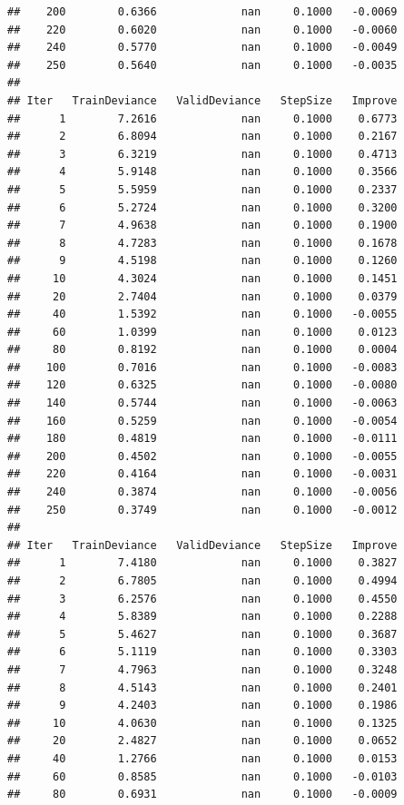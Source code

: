 \documentclass[]{book}
\begin{document}
\begin{verbatim}
##    200        0.6366             nan     0.1000   -0.0069
##    220        0.6020             nan     0.1000   -0.0060
##    240        0.5770             nan     0.1000   -0.0049
##    250        0.5640             nan     0.1000   -0.0035
## 
## Iter   TrainDeviance   ValidDeviance   StepSize   Improve
##      1        7.2616             nan     0.1000    0.6773
##      2        6.8094             nan     0.1000    0.2167
##      3        6.3219             nan     0.1000    0.4713
##      4        5.9148             nan     0.1000    0.3566
##      5        5.5959             nan     0.1000    0.2337
##      6        5.2724             nan     0.1000    0.3200
##      7        4.9638             nan     0.1000    0.1900
##      8        4.7283             nan     0.1000    0.1678
##      9        4.5198             nan     0.1000    0.1260
##     10        4.3024             nan     0.1000    0.1451
##     20        2.7404             nan     0.1000    0.0379
##     40        1.5392             nan     0.1000   -0.0055
##     60        1.0399             nan     0.1000    0.0123
##     80        0.8192             nan     0.1000    0.0004
##    100        0.7016             nan     0.1000   -0.0083
##    120        0.6325             nan     0.1000   -0.0080
##    140        0.5744             nan     0.1000   -0.0063
##    160        0.5259             nan     0.1000   -0.0054
##    180        0.4819             nan     0.1000   -0.0111
##    200        0.4502             nan     0.1000   -0.0055
##    220        0.4164             nan     0.1000   -0.0031
##    240        0.3874             nan     0.1000   -0.0056
##    250        0.3749             nan     0.1000   -0.0012
## 
## Iter   TrainDeviance   ValidDeviance   StepSize   Improve
##      1        7.4180             nan     0.1000    0.3827
##      2        6.7805             nan     0.1000    0.4994
##      3        6.2576             nan     0.1000    0.4550
##      4        5.8389             nan     0.1000    0.2288
##      5        5.4627             nan     0.1000    0.3687
##      6        5.1119             nan     0.1000    0.3303
##      7        4.7963             nan     0.1000    0.3248
##      8        4.5143             nan     0.1000    0.2401
##      9        4.2403             nan     0.1000    0.1986
##     10        4.0630             nan     0.1000    0.1325
##     20        2.4827             nan     0.1000    0.0652
##     40        1.2766             nan     0.1000    0.0153
##     60        0.8585             nan     0.1000   -0.0103
##     80        0.6931             nan     0.1000   -0.0009

\end{verbatim}
\end{document}
